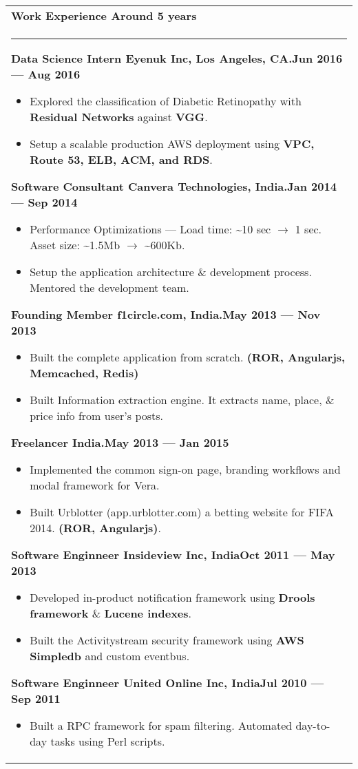 \documentclass{article}
\begin{document}
\begin{tabular}{p{\dimexpr\linewidth-2\tabcolsep}}
	\bfseries \large{Work Experience} \hfill Around 5 years \\
	\noindent\rule{\textwidth}{0.4pt}
	{\bfseries Data Science Intern \hfill Eyenuk Inc, Los Angeles, CA\@.\hfill Jun 2016 --- Aug 2016}
	\begin{itemize}
		\item Explored the classification of Diabetic Retinopathy with \textbf{Residual Networks} against \textbf{VGG}.
		\item Setup a scalable production AWS deployment using \textbf{VPC, Route 53, ELB, ACM, and RDS}\@.
	\end{itemize}

	\bigskip
	{\bfseries Software Consultant \hfill Canvera Technologies, India\@.\hfill Jan 2014 --- Sep 2014}
	\begin{itemize}
		\item Performance Optimizations --- Load time: \textasciitilde10 sec \( \rightarrow \) 1 sec. Asset size: \textasciitilde1.5Mb \( \rightarrow \) \textasciitilde600Kb.
		\item Setup the application architecture \& development process. Mentored the development team.
	\end{itemize}
	\bigskip 
	{\bfseries Founding Member \hfill f1circle.com, India\@.\hfill May 2013 --- Nov 2013}
	\begin{itemize}
		\item Built the complete application from scratch. \textbf{(ROR, Angularjs, Memcached, Redis)}
		\item Built Information extraction engine. It extracts name, place, \& price info from user's posts.
	\end{itemize}
	\bigskip
	{\bfseries Freelancer \hfill India.\hfill May 2013 --- Jan 2015}
	\begin{itemize}
		\item Implemented the common sign-on page, branding workflows and modal framework for Vera.
		\item Built Urblotter (app.urblotter.com) a betting website for FIFA 2014. \textbf{(ROR, Angularjs)}.
	\end{itemize}
	\bigskip
	{\bfseries Software Enginneer \hfill Insideview Inc, India\hfill Oct 2011 --- May 2013}
	\begin{itemize}
		\item Developed in-product notification framework using \textbf{Drools framework} \& \textbf{Lucene indexes}.
		\item Built the Activitystream security framework using \textbf{AWS Simpledb} and custom eventbus.
	\end{itemize}
	\bigskip
	{\bfseries Software Enginneer \hfill United Online Inc, India\hfill Jul 2010 --- Sep 2011}
	\begin{itemize}
		\item Built a RPC framework for spam filtering.  Automated day-to-day tasks using Perl scripts.
	\end{itemize}
\end{tabular}
\end{document}
